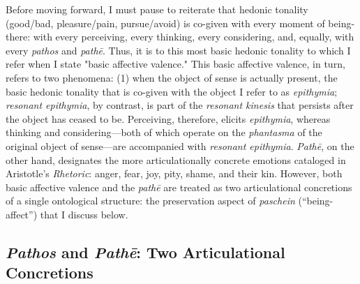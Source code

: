 \documentclass{article}
\begin{document}
Before moving forward, I must pause to reiterate that hedonic tonality (good/bad, pleasure/pain, pursue/avoid) is co-given with every moment of being-there: with every perceiving, every thinking, every considering, and, equally, with every \textit{pathos} and \textit{pathē}. Thus, it is to this most basic hedonic tonality to which I refer when I state "basic affective valence." This basic affective valence, in turn, refers to two phenomena: (1) when the object of sense is actually present, the basic hedonic tonality that is co-given with the object I refer to as \textit{epithymia}; \textit{resonant epithymia}, by contrast, is part of the \textit{resonant kinesis} that persists after the object has ceased to be. Perceiving, therefore, elicits \textit{epithymia}, whereas thinking and considering---both of which operate on the \textit{phantasma} of the original object of sense---are accompanied with \textit{resonant epithymia}. \textit{Pathē}, on the other hand, designates the more articulationally concrete emotions cataloged in Aristotle's \textit{Rhetoric}: anger, fear, joy, pity, shame, and their kin. However, both basic affective valence and the \textit{pathē} are treated as two articulational concretions of a single ontological structure: the preservation aspect of \textit{paschein} (``being-affect'') that I discuss below. 

\subsection{\textit{Pathos} and \textit{Pathē}: Two Articulational Concretions}
\end{document}
